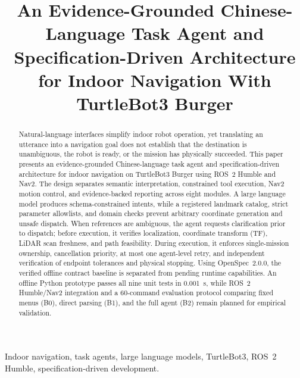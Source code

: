 \documentclass[conference,a4paper]{IEEEtran}
\begin{document}
\title{An Evidence-Grounded Chinese-Language Task Agent and Specification-Driven Architecture for Indoor Navigation With TurtleBot3 Burger}

\author{
}

\maketitle
\thispagestyle{empty}

\begin{abstract}
Natural-language interfaces simplify indoor robot operation, yet translating an utterance into a navigation goal does not establish that the destination is unambiguous, the robot is ready, or the mission has physically succeeded. This paper presents an evidence-grounded Chinese-language task agent and specification-driven architecture for indoor navigation on TurtleBot3 Burger using ROS~2 Humble and Nav2. The design separates semantic interpretation, constrained tool execution, Nav2 motion control, and evidence-backed reporting across eight modules. A large language model produces schema-constrained intents, while a registered landmark catalog, strict parameter allowlists, and domain checks prevent arbitrary coordinate generation and unsafe dispatch. When references are ambiguous, the agent requests clarification prior to dispatch; before execution, it verifies localization, coordinate transform (TF), LiDAR scan freshness, and path feasibility. During execution, it enforces single-mission ownership, cancellation priority, at most one agent-level retry, and independent verification of endpoint tolerances and physical stopping. Using OpenSpec~2.0.0, the verified offline contract baseline is separated from pending runtime capabilities. An offline Python prototype passes all nine unit tests in 0.001~s, while ROS~2 Humble/Nav2 integration and a 60-command evaluation protocol comparing fixed menus (B0), direct parsing (B1), and the full agent (B2) remain planned for empirical validation.
\end{abstract}

\begin{IEEEkeywords}
Indoor navigation, task agents, large language models, TurtleBot3, ROS~2 Humble, specification-driven development.
\end{IEEEkeywords}
\end{document}
